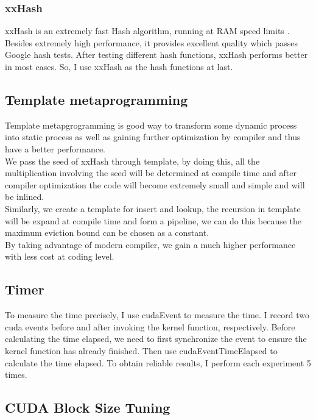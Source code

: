 \documentclass[10pt,twocolumn,letterpaper]{article}
\begin{document}
\subsubsection{xxHash}

xxHash is an extremely fast Hash algorithm, running at RAM speed limits \cite{collet2016xxhash}. Besides extremely high performance, it provides excellent quality which passes Google hash tests. After testing different hash functions, xxHash performs better in most cases. So, I use xxHash as the hash functions at last.

\subsection{Template metaprogramming}

Template metapgrogramming is good way to transform some dynamic process into static process as well as gaining further optimization by compiler and thus have a better performance. \\
We pass the seed of xxHash through template, by doing this, all the multiplication involving the seed will be determined at compile time and after compiler optimization the code will become extremely small and simple and will be inlined.\\
Similarly, we create a template for insert and lookup, the recursion in template will be expand at compile time and form a pipeline, we can do this because the maximum eviction bound can be chosen as a constant.\\
By taking advantage of modern compiler, we gain a much higher performance with less cost at coding level.

\subsection{Timer}

To measure the time precisely, I use cudaEvent to measure the time. I record two cuda events before and after invoking the kernel function, respectively. Before calculating the time elapsed, we need to first synchronize the event to ensure the kernel function has already finished. Then use cudaEventTimeElapsed to calculate the time elapsed. To obtain reliable results, I perform each experiment 5 times. 

\subsection{CUDA Block Size Tuning}
\end{document}
